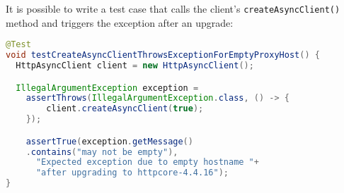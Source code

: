 
It is possible to write a test case that calls the client's \texttt{createAsyncClient()} method
and triggers the exception after an upgrade:
\begin{lstlisting}[language=Java,basicstyle=\scriptsize\ttfamily]
@Test
void testCreateAsyncClientThrowsExceptionForEmptyProxyHost() {
  HttpAsyncClient client = new HttpAsyncClient();

  IllegalArgumentException exception =
    assertThrows(IllegalArgumentException.class, () -> {
        client.createAsyncClient(true);
    });

    assertTrue(exception.getMessage()
    .contains("may not be empty"),
      "Expected exception due to empty hostname "+
      "after upgrading to httpcore-4.4.16");
}
\end{lstlisting}




